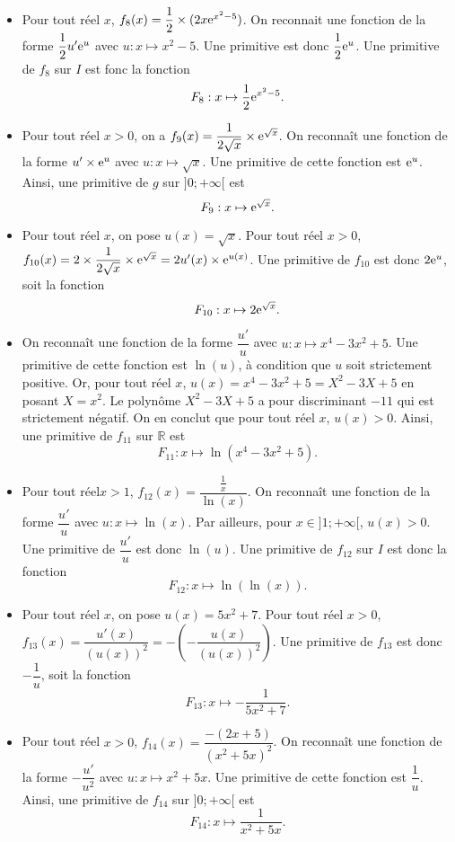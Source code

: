 \documentclass[11pt,fleqn, openany]{book} %
\begin{document}
\begin{solution}
\begin{itemize}
\item  Pour tout réel \(x\), \(f_8(x)=\dfrac{1}{2} \times (2x\mathrm{e}^{x^2-5})\). On reconnait une fonction de la forme \(\dfrac{1}{2}u'\mathrm{e}^u\) avec \(u:x\mapsto x^2-5\). Une primitive est donc \(\dfrac{1}{2}\mathrm{e}^u\). Une primitive de \(f_8\) sur \(I\) est fonc la fonction \[F_8:x\mapsto \dfrac{1}{2}\mathrm{e}^{x^2-5}.\]

\item Pour tout réel \(x>0\), on a \(f_9(x)= \dfrac{1}{2\sqrt{x}} \times \mathrm{e}^{\sqrt{x}}\). On reconnaît une fonction de la forme \(u' \times \mathrm{e}^u\) avec \(u:x\mapsto \sqrt{x}\). Une primitive de cette fonction est \(\mathrm{e}^u\). Ainsi, une primitive de \(g\) sur \(]0;+\infty[\) est
\[ F_9: x \mapsto \mathrm{e}^{\sqrt{x}}.\]

\item Pour tout réel \(x\), on pose \(u(x)=\sqrt{x}\). Pour tout réel \(x>0\), \(f_{10}(x)=2 \times \dfrac{1}{2\sqrt{x}} \times \mathrm{e}^{\sqrt{x}} = 2u'(x) \times \mathrm{e}^{u(x)}\). Une primitive de \(f_{10}\) est donc \(2\mathrm{e}^u\), soit la fonction \[F_{10}:x\mapsto 2\mathrm{e}^{\sqrt{x}}.\]

\item On reconnaît une fonction de la forme \(\dfrac{u'}{u}\) avec \(u:x\mapsto x^4-3x^2+5\). Une primitive de cette fonction est \(\ln(u)\), à condition que \(u\) soit strictement positive. Or, pour tout réel \(x\), \(u(x)=x^4-3x^2+5=X^2-3X+5\) en posant \(X=x^2\). Le polynôme \(X^2-3X+5\) a pour discriminant \(-11\) qui est strictement négatif. On en conclut que pour tout réel \(x\), \(u(x)>0\). Ainsi, une primitive de \(f_{11}\) sur \(\mathbb{R}\) est
\[ F_{11}: x \mapsto \ln(x^4-3x^2+5).\]

\item Pour tout réel\(x>1\), \(f_{12}(x)=\dfrac{\frac{1}{x}}{\ln (x)}\). On reconnaît une fonction de la forme \(\dfrac{u'}{u}\) avec \(u:x\mapsto \ln(x)\). Par ailleurs, pour \(x \in ]1;+\infty[\), \(u(x)>0\). Une primitive de \(\dfrac{u'}{u}\)  est donc \(\ln(u)\). Une primitive de \(f_{12}\) sur \(I\) est donc la fonction \[F_{12}:x\mapsto \ln(\ln(x)).\]

\item Pour tout réel \(x\), on pose \(u(x)=5x^2+7\). Pour tout réel \(x>0\), \(f_{13}(x)=\dfrac{u'(x)}{(u(x))^2}=-\left(-\dfrac{u(x)}{(u(x))^2}\right)\). Une primitive de \(f_{13}\) est donc \(-\dfrac{1}{u}\), soit la fonction \[F_{13}:x\mapsto -\dfrac{1}{5x^2+7}.\]


\item  Pour tout réel \(x>0\), \(f_{14}(x)=\dfrac{-(2x+5)}{(x^2+5x)^2}\). On reconnaît une fonction de la forme \(-\dfrac{u'}{u^2}\) avec \(u:x\mapsto x^2+5x\). Une primitive de cette fonction est \(\dfrac{1}{u}\). Ainsi, une primitive de \(f_{14}\) sur \(]0;+\infty[\) est
\[ F_{14} : x \mapsto \dfrac{1}{x^2+5x}.\]

\end{itemize} \end{solution}
\end{document}
